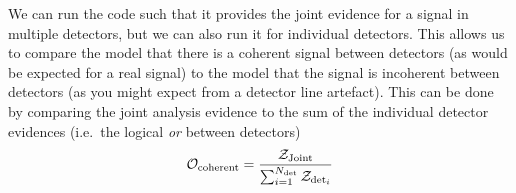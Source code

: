 We can run the code such that it provides the joint evidence for a signal in multiple detectors, but we can
also run it for individual detectors. This allows us to compare the model that there is a coherent signal
between detectors (as would be expected for a real signal) to the model that the signal is incoherent between
detectors (as you might expect from a detector line artefact). This can be done by comparing the joint
analysis evidence to the sum of the individual detector evidences (i.e.\ the logical {\it or} between
detectors)
\begin{equation}
\mathcal{O}_{\rm coherent} = \frac{\mathcal{Z}_{\rm Joint}}{\sum_{i=1}^{N_{\rm det}} \mathcal{Z}_{{\rm det}_i}}
\end{equation}

  
  